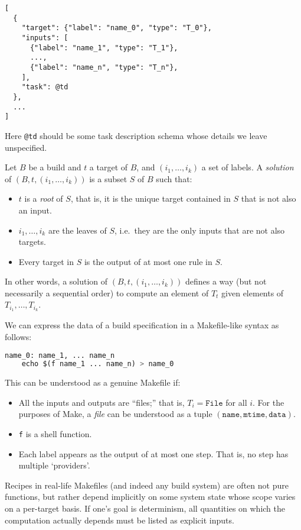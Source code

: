 \begin{lstlisting}
[
  {
    "target": {"label": "name_0", "type": "T_0"},
    "inputs": [
      {"label": "name_1", "type": "T_1"},
      ...,
      {"label": "name_n", "type": "T_n"},
    ],
    "task": @td
  },
  ...
]
\end{lstlisting}

Here \texttt{@td} should be some task description schema whose details we leave unspecified.

\begin{definition}
  Let \(B\) be a build and \(t\) a target of \(B\), and \((i_1,\ldots,i_k)\) a set of labels. 
  A \emph{solution} of \((B,t,(i_1,\ldots,i_k))\) is a subset \(S\) of \(B\) such that:

  \begin{itemize}
  \item
    \(t\) is a \emph{root} of \(S\), that is, it is the unique target contained in $S$ that is not also an input.
  \item
    \(i_1,\ldots,i_k\) are the leaves of \(S\), i.e.~they are the only inputs that are not also targets.
  \item
    Every target in \(S\) is the output of at most one rule in \(S\).
  \end{itemize}

\end{definition}

In other words, a solution of \((B,t,(i_1,\ldots,i_k))\) defines a way (but not necessarily a sequential order) to compute an element of \(T_t\) given elements of \(T_{i_1},\ldots,T_{i_k}\).

\begin{example}
  We can express the data of a build specification in a Makefile-like syntax as follows:

  
\begin{lstlisting}[language=Python]
name_0: name_1, ... name_n
    echo $(f name_1 ... name_n) > name_0
\end{lstlisting}

This can be understood as a genuine Makefile if:

\begin{itemize}
\item
  All the inputs and outputs are ``files;'' that is, \(T_i=\mathtt{File}\) for all \(i\). 
  For the purposes of Make, a \emph{file} can be understood as a tuple \((\mathtt{name},\mathtt{mtime}, \mathtt{data})\).
\item
  \texttt{f} is a shell function.
\item
  Each label appears as the output of at most one step. That is, no step has multiple `providers'.
\end{itemize}

  Recipes in real-life Makefiles (and indeed any build system) are often not pure functions, but rather depend implicitly on some system state whose scope varies on a per-target basis. 
  If one's goal is determinism, all quantities on which the computation actually depends must be listed as explicit inputs.
\end{example}

